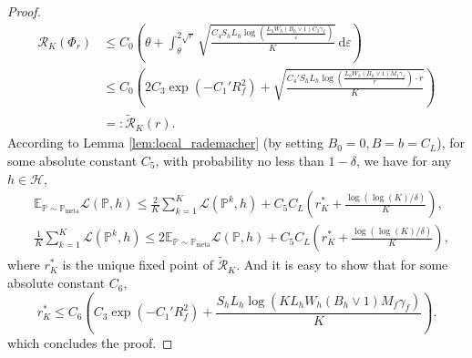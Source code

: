 \documentclass{article}
\numberwithin{equation}{section}
\newcommand{\E}{\mathbb{E}}
\newcommand{\dif}{\mathrm{d}}
\theoremstyle{definition}
\newcommand{\Pmeta}{\mathbb{P}_{\text{meta}}}
\renewcommand{\P}{\mathbb{P}}
\begin{document}
\begin{proof}
\begin{equation}
        \begin{aligned}
            \mathcal{R}_K(\Phi_r)
            &\leq C_0\left(\theta+\int_\theta^{2\sqrt{r}}\sqrt{\frac{C_4S_hL_h\log\left(\frac{L_hW_h(B_h\vee 1)C_3\gamma_f}{\varepsilon}\right)}{K}}\ \dif\varepsilon\right) \\
            &\leq C_0\left(2C_3\exp(-C_1'R_f^2)+\sqrt{\frac{C_4'S_hL_h\log\left(\frac{L_hW_h(B_h\vee 1)M_f\gamma_f}{r}\right)\cdot r}{K}} \right) \\
            &=: \widetilde{\mathcal{R}}_K(r).
        \end{aligned}
    \end{equation}
    According to Lemma \ref{lem:local_rademacher} (by setting $B_0=0,B=b=C_L$), for some absolute constant $C_5$, with probability no less than $1-\delta$, we have for any $h\in\mathcal{H}$,
    \begin{align}
        &\E_{\P\sim\Pmeta}\mathcal{L}(\P,h)
        \leq \frac{2}{K}\sum_{k=1}^K\mathcal{L}(\P^k,h)+C_5C_L\left(r_K^*+\frac{\log(\log (K)/\delta)}{K}\right), \\
        &\frac{1}{K}\sum_{k=1}^K\mathcal{L}(\P^k,h)\leq 2\E_{\P\sim\Pmeta}\mathcal{L}(\P,h)
        +C_5C_L\left(r_K^*+\frac{\log(\log (K)/\delta)}{K}\right),
    \end{align}
    where $r_K^*$ is the unique fixed point of $\widetilde{\mathcal{R}}_K$.
    And it is easy to show that for some absolute constant $C_6$,
    \begin{equation}
        r_K^*\leq C_6\left(C_3\exp(-C_1'R_f^2)+\frac{S_hL_h\log\left(KL_hW_h(B_h\vee 1)M_f\gamma_f\right)}{K}\right).
    \end{equation}
    which concludes the proof.
\end{proof}
\end{document}
